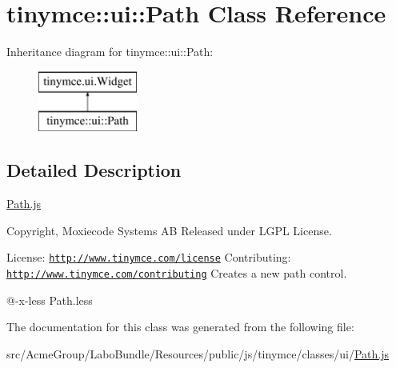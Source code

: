 \hypertarget{classtinymce_1_1ui_1_1_path}{\section{tinymce\+:\+:ui\+:\+:Path Class Reference}
\label{classtinymce_1_1ui_1_1_path}
}
Inheritance diagram for tinymce\+:\+:ui\+:\+:Path\+:\begin{figure}[H]
\begin{center}
\leavevmode
\includegraphics[height=2.000000cm]{classtinymce_1_1ui_1_1_path}
\end{center}
\end{figure}


\subsection{Detailed Description}
\hyperlink{_path_8js}{Path.\+js}

Copyright, Moxiecode Systems A\+B Released under L\+G\+P\+L License.

License\+: \href{http://www.tinymce.com/license}{\tt http\+://www.\+tinymce.\+com/license} Contributing\+: \href{http://www.tinymce.com/contributing}{\tt http\+://www.\+tinymce.\+com/contributing} Creates a new path control.

@-\/x-\/less Path.\+less 

The documentation for this class was generated from the following file\+:\begin{DoxyCompactItemize}
\item 
src/\+Acme\+Group/\+Labo\+Bundle/\+Resources/public/js/tinymce/classes/ui/\hyperlink{_path_8js}{Path.\+js}\end{DoxyCompactItemize}
